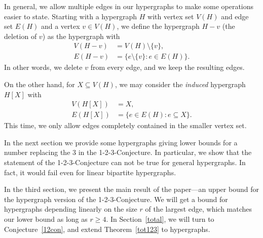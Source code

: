 \documentclass[reqno,12pt,epsf]{amsart}
\begin{document}
In general, we allow multiple edges in our hypergraphs to make some operations easier to state. 
%
Starting with a hypergraph $H$ with vertex set $V(H)$ and edge set $E(H)$ and a vertex $v\in V(H)$, we define the hypergraph $H-v$ (the deletion of $v$) as the hypergraph with
\begin{align*}
V(H-v)&=V(H)\setminus\{v\},\\
E(H-v)&=\{e\setminus\{v\}:e\in E(H)\}.
\end{align*}
In other words, we delete $v$ from every edge, and we keep the resulting edges.

On the other hand, for $X\subseteq V(H)$, we may consider the {\em induced} hypergraph $H[X]$ with
 \begin{align*}
V(H[X])&=X,\\
E(H[X])&=\{e\in E(H):e\subseteq X\}.
\end{align*}
This time, we only allow edges completely contained in the smaller vertex set.

In the next section we provide some hypergraphs giving lower bounds for a number replacing the $3$ in the 1-2-3-Conjecture. In particular, we show that the statement of the 1-2-3-Conjecture can not be true for general hypergraphs. In fact, it would fail even for linear bipartite hypergraphs.

In the third section, we present the main result of the paper---an upper bound for the hypergraph version of the 1-2-3-Conjecture. We will get a bound for hypergraphs depending linearly on the size $r$ of the largest edge, which matches our lower bound as long as $r\ge 4$. %
In Section~\ref{total}, we will turn to Conjecture~\ref{12con}, and extend Theorem~\ref{tot123} to hypergraphs.

\end{document}
